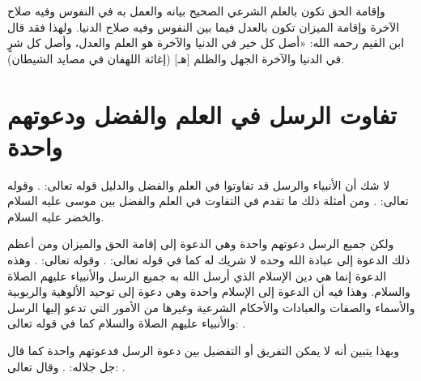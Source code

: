 وإقامة الحق تكون بالعلم الشرعي الصحيح بيانه والعمل به في النفوس وفيه صلاح الآخرة وإقامة الميزان تكون بالعدل فيما بين النفوس وفيه صلاح الدنيا. ولهذا فقد قال ابن القيم رحمه الله: «أصل كل خير في الدنيا والآخرة هو العلم والعدل، وأصل كل شرٍ في الدنيا والآخرة الجهل والظلم [هـ] {\footnotesize (إغاثة اللهفان في مصايد الشيطان)}.

\section{تفاوت الرسل في العلم والفضل ودعوتهم واحدة}

لا شك أن الأنبياء والرسل قد تفاوتوا في العلم والفضل والدليل قوله تعالى: 
\quranayah*[2][253]{\footnotesize \surahname*[2]}. وقوله تعالى:
\quranayah*[17][55]{\footnotesize \surahname*[17]}. ومن أمثلة ذلك ما تقدم في التفاوت في العلم والفضل بين موسى عليه السلام والخضر عليه السلام. 

ولكن جميع الرسل دعوتهم واحدة وهي الدعوة إلى إقامة الحق والميزان ومن أعظم ذلك الدعوة إلى عبادة الله وحده لا شريك له كما في قوله تعالى: 
\quranayah*[16][36]{\footnotesize \surahname*[16]}. وقوله تعالى:
\quranayah*[21][25]{\footnotesize \surahname*[21]}. وهذه الدعوة إنما هي دين الإسلام الذي أرسل الله به جميع الرسل والأنبياء عليهم الصلاة والسلام. وهذا فيه أن الدعوة إلى الإسلام واحدة وهي دعوة إلى توحيد الألوهية والربوبية والأسماء والصفات والعبادات والأحكام الشرعية وغيرها من الأمور التي تدعو إليها الرسل والأنبياء عليهم الصلاة والسلام كما في قوله تعالى: 
\quranayah*[42][13]{\footnotesize \surahname*[42]}.

وبهذا يتبين أنه لا يمكن التفريق أو التفضيل بين دعوة الرسل فدعوتهم واحدة كما قال جل جلاله: \quranayah*[2][136]{\footnotesize \surahname*[2]}. وقال تعالى:
\quranayah*[2][285]{\footnotesize \surahname*[2]}.

